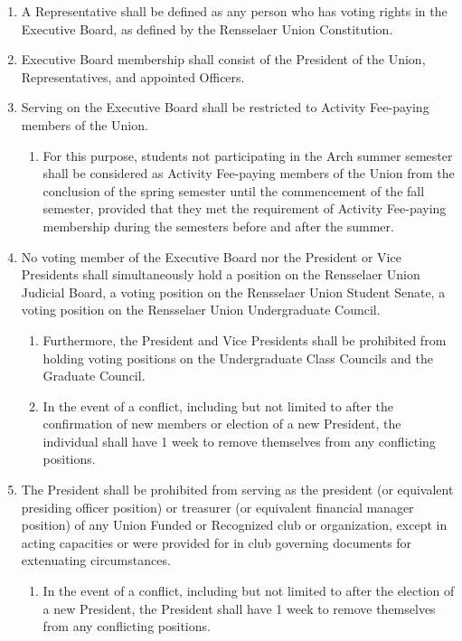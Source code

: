 \documentclass{uniondoc}
\begin{document}
\begin{enumerate}
\item A Representative shall be defined as any person who has voting rights in the Executive Board, as defined by the Rensselaer Union Constitution.
\item Executive Board membership shall consist of the President of the Union, Representatives, and appointed Officers.
\item Serving on the Executive Board shall be restricted to Activity Fee-paying members of the Union.
  \begin{enumerate}
  \item For this purpose, students not participating in the Arch summer semester shall be considered as Activity Fee-paying members of the Union from the conclusion of the spring semester until the commencement of the fall semester, provided that they met the requirement of Activity Fee-paying membership during the semesters before and after the summer.
  \end{enumerate}
\item No voting member of the Executive Board nor the President or Vice Presidents shall simultaneously hold a position on the Rensselaer Union Judicial Board, a voting position on the Rensselaer Union Student Senate, a voting position on the Rensselaer Union Undergraduate Council.
  \begin{enumerate}
  \item Furthermore, the President and Vice Presidents shall be prohibited from holding voting positions on the Undergraduate Class Councils and the Graduate Council.
  \item In the event of a conflict, including but not limited to after the confirmation of new members or election of a new President, the individual shall have 1 week to remove themselves from any conflicting positions.
  \end{enumerate}
\item The President shall be prohibited from serving as the president (or equivalent presiding officer position) or treasurer (or equivalent financial manager position) of any Union Funded or Recognized club or organization, except in acting capacities or were provided for in club governing documents for extenuating circumstances.
  \begin{enumerate}
  \item In the event of a conflict, including but not limited to after the election of a new President, the President shall have 1 week to remove themselves from any conflicting positions.
  \end{enumerate}
\end{enumerate}
\end{document}
